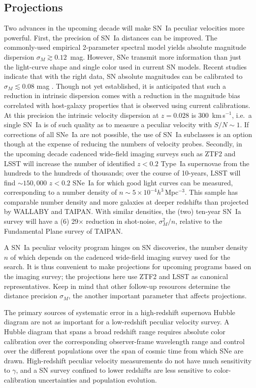 \documentclass[11pt, oneside]{article}   	%
\begin{document}
\subsection{Projections}
Two advances in the upcoming decade will make SN~Ia peculiar velocities more powerful.
First, the precision of SN~Ia distances can be improved.  The commonly-used empirical 2-parameter spectral model yields  absolute magnitude
dispersion $\sigma_M \gtrsim 0.12$~mag.  However, SNe transmit more information than just the light-curve shape and single color used in current SN models.
Recent studies indicate that with the right data, SN absolute
magnitudes can be calibrated to $\sigma_M \lesssim 0.08$ mag \cite[see e.g.][]{2012MNRAS.425.1007B, 2015ApJ...815...58F}. 
Though not yet
established, it is anticipated that such a reduction in intrinsic dispersion comes with a reduction in the magnitude bias correlated with host-galaxy properties
that is observed using current calibrations.  At this precision the intrinsic velocity dispersion  at $z=0.028$ is  $300$~km\,s$^{-1}$, i.e.\ a single SN~Ia  is of such quality as to
measure a peculiar velocity with $S/N \sim 1$.
 If corrections of all SNe~Ia are not possible, the use of SN~Ia subclasses is an option though at the expense of reducing the
numbers of velocity probes.
Secondly,  in the upcoming decade cadenced wide-field imaging surveys such as ZTF2 and LSST
  will increase the number of identified  $z<0.2$ Type~Ia supernovae from the hundreds to the
hundreds of thousands; over the course of 10-years, LSST will find $\sim150,000$ $z<0.2$ SNe~Ia
 for which good light curves can be measured, corresponding to a  number density of $n \sim 5\times 10^{-4}h^3$\,Mpc$^{-3}$.
  This sample has comparable
 number density and more galaxies at deeper redshifts than projected by WALLABY and TAIPAN.  With similar densities,
 the (two) ten-year SN~Ia survey will have
 a (6) 29$\times$ reduction in shot-noise, $\sigma^2_M/n$, relative to the Fundamental Plane survey of TAIPAN.

A SN~Ia peculiar velocity program hinges on  SN discoveries, the number density $n$ of which
depends on the cadenced wide-field imaging survey used for the search.    
It is thus convenient to make projections for upcoming programs
based on the imaging survey; the projections here use ZTF2 and LSST 
as canonical representatives.
Keep in mind that other follow-up resources determine the distance precision $\sigma_M$, the another important parameter
that affects projections.


The primary sources of systematic error in a high-redshift supernova Hubble diagram are not as important for a low-redshift
peculiar velocity survey.  A Hubble diagram that spans a broad redshift range requires absolute color calibration over the corresponding observer-frame
wavelength range and control over the different populations over the span of cosmic time from which SNe are drawn.  High-redshift peculiar
velocity measurements do not have much sensitivity to $\gamma$, and a SN survey confined to lower redshifts are less sensitive to
color-calibration uncertainties and population evolution.
\end{document}

